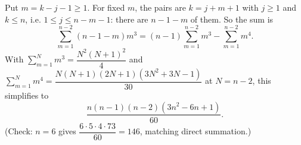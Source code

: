 Put $m=k-j-1\ge1$. For fixed $m$, the pairs are $k=j+m+1$ with $j\ge1$ and $k\le n$, i.e. $1\le j\le n-m-1$: there are $n-1-m$ of them. So the sum is
\[\sum_{m=1}^{n-2}(n-1-m)m^3=(n-1)\sum_{m=1}^{n-2}m^3-\sum_{m=1}^{n-2}m^4.\]
With $\sum_{m=1}^{N}m^3=\dfrac{N^2(N+1)^2}4$ and $\sum_{m=1}^Nm^4=\dfrac{N(N+1)(2N+1)(3N^2+3N-1)}{30}$ at $N=n-2$, this simplifies to
\[\boxed{\dfrac{n(n-1)(n-2)(3n^2-6n+1)}{60}}.\]
(Check: $n=6$ gives $\dfrac{6\cdot5\cdot4\cdot73}{60}=146$, matching direct summation.)
